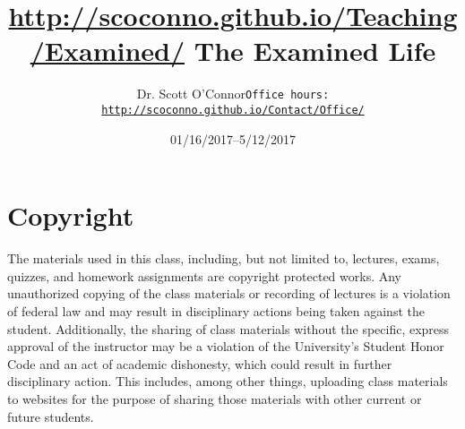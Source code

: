 \documentclass[article,oneside]{memoir}
\def\myauthor{Author}
\def\mytitle{Title}
\def\mycopyright{\myauthor}
\def\myweb{\href{http://scoconno.github.io/Teaching/Examined/}{http://scoconno.github.io/Teaching/Examined/}}
\def\myauthor{Dr. Scott O'Connor}
\def\mytitle{{\normalsize \myweb \newline} \HUGE The Examined Life}
\begin{document}
\setsansfont[Mapping=tex-text]{Myriad Pro} 
\setmonofont[Mapping=tex-text,Scale=0.8]{Georgia} 

\def\ind{\hangindent=1 true cm\hangafter=1 \noindent}
\def\labelitemi{$\cdot$}


\title{\LARGE \mytitle}     
\author{\Large\myauthor \newline \footnotesize\texttt{\noindent Office hours: \href{http://scoconno.github.io/Contact/Office/}{http://scoconno.github.io/Contact/Office/}}}
\date{01/16/2017--5/12/2017}


\maketitle




%
%

\section{Copyright}
The materials used in this class, including, but not limited to, lectures, exams, quizzes, and homework assignments are copyright protected works.  Any unauthorized copying of the class materials or recording of lectures is a violation of federal law and may result in disciplinary actions being taken against the student.  Additionally, the sharing of class materials without the specific, express approval of the instructor may be a violation of the University's Student Honor Code and an act of academic dishonesty, which could result in further disciplinary action.  This includes, among other things, uploading class materials to websites for the purpose of sharing those materials with other current or future students. 
\end{document}
